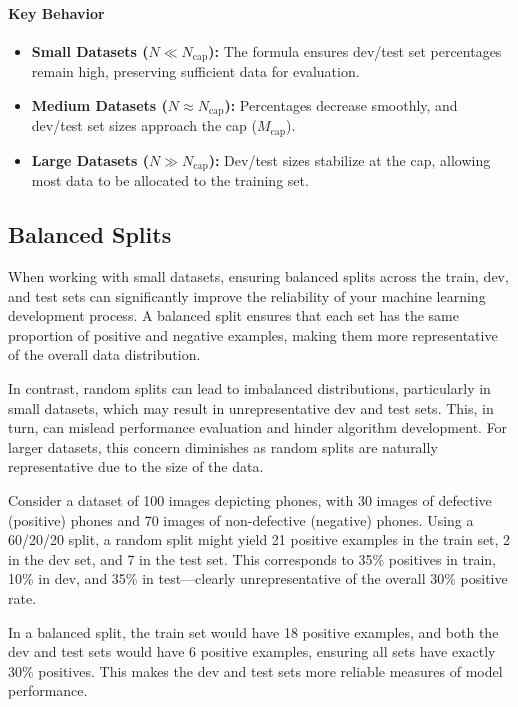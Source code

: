 \documentclass[12pt,openany]{book}
\begin{document}
\paragraph{Key Behavior}
\begin{itemize}
    \item \textbf{Small Datasets (\(N \ll N_{\text{cap}}\)):} The formula ensures dev/test set percentages remain high, preserving sufficient data for evaluation.
    \item \textbf{Medium Datasets (\(N \approx N_{\text{cap}}\)):} Percentages decrease smoothly, and dev/test set sizes approach the cap (\(M_{\text{cap}}\)).
    \item \textbf{Large Datasets (\(N \gg N_{\text{cap}}\)):} Dev/test sizes stabilize at the cap, allowing most data to be allocated to the training set.
\end{itemize}

\subsection{Balanced Splits}

When working with small datasets, ensuring balanced splits across the train, dev, and test sets can significantly improve the reliability of your machine learning development process. A balanced split ensures that each set has the same proportion of positive and negative examples, making them more representative of the overall data distribution. \newline

In contrast, random splits can lead to imbalanced distributions, particularly in small datasets, which may result in unrepresentative dev and test sets. This, in turn, can mislead performance evaluation and hinder algorithm development. For larger datasets, this concern diminishes as random splits are naturally representative due to the size of the data.

\begin{examplebox}
Consider a dataset of 100 images depicting phones, with 30 images of defective (positive) phones and 70 images of non-defective (negative) phones. Using a 60/20/20 split, a random split might yield 21 positive examples in the train set, 2 in the dev set, and 7 in the test set. This corresponds to 35\% positives in train, 10\% in dev, and 35\% in test—clearly unrepresentative of the overall 30\% positive rate.

In a balanced split, the train set would have 18 positive examples, and both the dev and test sets would have 6 positive examples, ensuring all sets have exactly 30\% positives. This makes the dev and test sets more reliable measures of model performance.
\end{examplebox}
\end{document}
